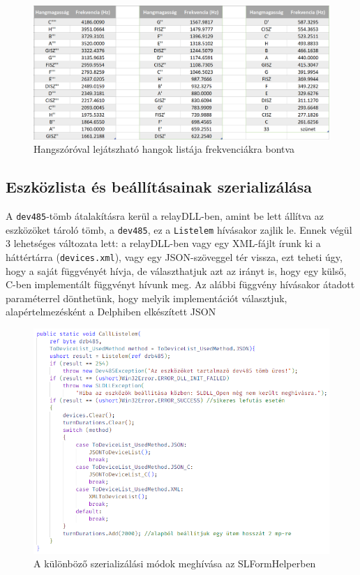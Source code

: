 \documentclass[tocnopagenum]{thesis-ekf}
\begin{document}
	\begin{figure}[H]
		\centering
		\includegraphics[scale=0.65]{frequencies}
		\caption{Hangszóróval lejátszható hangok listája frekvenciákra bontva}
		\label{fig:frequencies}
	\end{figure}
	
	\subsection{Eszközlista és beállításainak szerializálása}
		A \verb*|dev485|-tömb átalakításra kerül a relayDLL-ben, amint be lett állítva az eszközöket tároló tömb, a \verb*|dev485|, ez a \verb*|Listelem| hívásakor zajlik le. Ennek végül 3 lehetséges változata lett: a relayDLL-ben vagy egy XML-fájlt írunk ki a háttértárra (\verb*|devices.xml|), vagy egy JSON-szöveggel tér vissza, ezt teheti úgy, hogy a saját függvényét hívja, de választhatjuk azt az irányt is, hogy egy külső, C-ben implementált függvényt hívunk meg. 
		Az alábbi függvény hívásakor átadott paraméterrel dönthetünk, hogy melyik implementációt választjuk, alapértelmezésként a Delphiben elkészített JSON
		
		\begin{figure}[H]
			\centering
			\includegraphics[scale=0.65]{images/listelem_csharp.PNG}
			\caption{A különböző szerializálási módok meghívása az SLFormHelperben}
			\label{fig:listelem_csharp}
		\end{figure}
	
\end{document}
